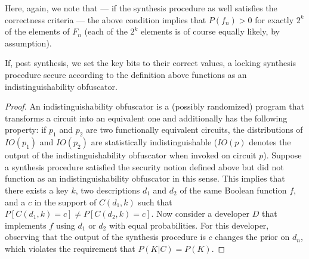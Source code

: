 Here, again, we note that --- if the synthesis procedure as well satisfies the correctness criteria --- the above condition implies that $P(f_n)>0$ for exactly $2^k$ of the elements of $F_n$ (each of the $2^k$ elements is of course equally likely, by assumption).


\begin{proposition}
If, post synthesis, we set the key bits to their correct values, a locking synthesis procedure secure according to the definition above functions as an indistinguishability obfuscator.
\end{proposition}

\begin{proof}
An indistinguishability obfuscator is a (possibly randomized) program that transforms a circuit into an equivalent one and additionally has the following property: if $p_1$ and $p_2$ are two functionally equivalent circuits, the distributions of $IO(p_1)$ and $IO(p_2)$ are statistically indistinguishable ($IO(p)$ denotes the output of the indistinguishability obfuscator when invoked on circuit $p$). Suppose a synthesis procedure satisfied the security notion defined above but did not function as an indistinguishability obfuscator in this sense. This implies that there exists a key $k$, two descriptions $d_1$ and $d_2$ of the same Boolean function $f$, and a $c$ in the support of $C(d_1,k)$ such that $P[C(d_1,k)=c]\neq P[C(d_2,k)=c]$. Now consider a developer $D$ that implements $f$ using $d_1$ or $d_2$ with equal probabilities. For this developer, observing that the output of the synthesis procedure is $c$ changes the prior on $d_n$, which violates the requirement that $P(K|C)=P(K)$.
\end{proof}


